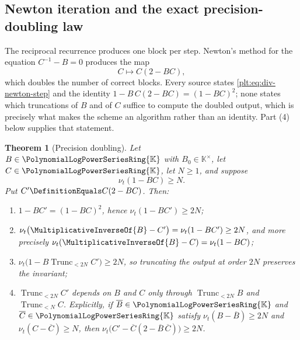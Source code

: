 \documentclass[11pt,oneside]{article}
\theoremstyle{plain}
\newtheorem{theorem}{Theorem}[section]
\theoremstyle{definition}
\theoremstyle{remark}
\newcommand{\K}{\mathbb{K}}
\newcommand{\PLpow}{\PolynomialLogPowerSeriesRing{\K}}   %
\newcommand{\ordt}{\nu_{t}}                              %
\newcommand{\Trunc}[2]{\operatorname{Trunc}_{<#2}#1}     %
\newcommand{\recip}[1]{\MultiplicativeInverseOf{#1}}
\begin{document}
\subsection{Newton iteration and the exact precision-doubling law}
\label{plt:sec:div-newton}

The reciprocal recurrence produces one block per step.  Newton's method for
the equation \(C^{-1}-B=0\) produces the map
\begin{equation}\label{plt:eq:div-newton-step}
  C\longmapsto C(2-BC),
\end{equation}
which doubles the number of correct blocks.  Every source states
\cref{plt:eq:div-newton-step} and the identity
\(1-B\,C(2-BC)=(1-BC)^{2}\); none
states which truncations of \(B\) and of \(C\) suffice to compute the doubled
output, which is precisely what makes the scheme an algorithm rather than an
identity.  Part (4) below supplies that statement.

\begin{theorem}[Precision doubling]\label{plt:thm:div-newton}
Let \(B\in\PLpow\) with \(B_{0}\in\K^{\times}\), let \(C\in\PLpow\), let
\(N\ge1\), and suppose
\begin{equation}\label{plt:eq:div-newton-invariant}
  \ordt(1-BC)\ge N .
\end{equation}
Put \(C'\DefinitionEquals C(2-BC)\).  Then:
\begin{enumerate}
\item \(1-BC'=(1-BC)^{2}\), hence \(\ordt(1-BC')\ge2N\);
\item \(\ordt\bigl(\recip{B}-C'\bigr)=\ordt(1-BC')\ge 2N\), and more
      precisely \(\ordt(\recip{B}-C)=\ordt(1-BC)\);
\item \(\ordt\bigl(1-B\Trunc{C'}{2N}\bigr)\ge2N\), so truncating the output at
      order \(2N\) preserves the invariant;
\item \(\Trunc{C'}{2N}\) depends on \(B\) and \(C\) only through
      \(\Trunc{B}{2N}\) and \(\Trunc{C}{N}\).  Explicitly, if
      \(\overline B\in\PLpow\) and \(\overline C\in\PLpow\) satisfy
      \(\ordt(B-\overline B)\ge2N\) and \(\ordt(C-\overline C)\ge N\), then
      \(\ordt\bigl(C'-\overline C(2-\overline B\,\overline C)\bigr)\ge2N\).
\end{enumerate}
\end{theorem}
\end{document}
